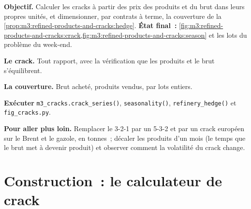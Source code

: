 \begin{tutorial}
\textbf{Objectif.} Calculer les cracks à partir des prix des produits et du brut dans leurs propres unités, et
dimensionner, par contrats à terme, la couverture de la \cref{prop:m3:refined-products-and-cracks:hedge}.
\textbf{État final~:} \cref{fig:m3:refined-products-and-cracks:crack,fig:m3:refined-products-and-cracks:season}
et les lots du problème du week-end.
\begin{tutsteps}
\item \textbf{Le crack.} Tout rapport, avec la vérification que les produits et le brut s'équilibrent.
\label{lst:m3:refined-products-and-cracks:crack}
\item \textbf{La couverture.} Brut acheté, produits vendus, par lots entiers.
\label{lst:m3:refined-products-and-cracks:lots}
\item \textbf{Exécuter} \texttt{m3\_cracks.crack\_series()}, \texttt{seasonality()},
\texttt{refinery\_hedge()} et \texttt{fig\_cracks.py}.
\end{tutsteps}
\textbf{Pour aller plus loin.} Remplacer le 3-2-1 par un 5-3-2 et par un crack européen sur
le Brent et le gazole, en tonnes~; décaler les produits d'un mois (le temps que le brut met à
devenir produit) et observer comment la volatilité du crack change.
\end{tutorial}

\section{Construction~: le calculateur de crack}\label{bld:m3:refined-products-and-cracks:cracks}

